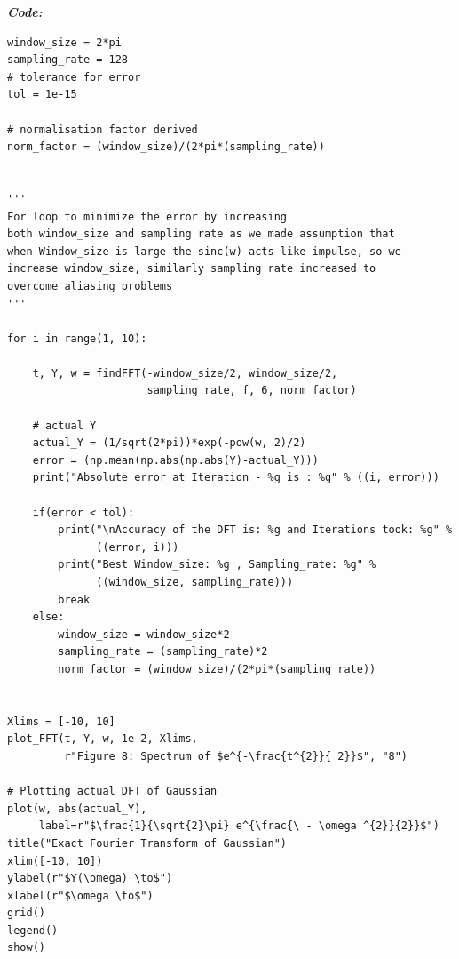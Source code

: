 \documentclass[11pt, a4paper]{article}
\begin{document}
\textit{\textbf{Code:}}
   \begin{lstlisting}
window_size = 2*pi
sampling_rate = 128
# tolerance for error
tol = 1e-15

# normalisation factor derived
norm_factor = (window_size)/(2*pi*(sampling_rate))


'''
For loop to minimize the error by increasing 
both window_size and sampling rate as we made assumption that
when Window_size is large the sinc(w) acts like impulse, so we
increase window_size, similarly sampling rate increased to 
overcome aliasing problems
'''

for i in range(1, 10):

    t, Y, w = findFFT(-window_size/2, window_size/2,
                      sampling_rate, f, 6, norm_factor)

    # actual Y
    actual_Y = (1/sqrt(2*pi))*exp(-pow(w, 2)/2)
    error = (np.mean(np.abs(np.abs(Y)-actual_Y)))
    print("Absolute error at Iteration - %g is : %g" % ((i, error)))

    if(error < tol):
        print("\nAccuracy of the DFT is: %g and Iterations took: %g" %
              ((error, i)))
        print("Best Window_size: %g , Sampling_rate: %g" %
              ((window_size, sampling_rate)))
        break
    else:
        window_size = window_size*2
        sampling_rate = (sampling_rate)*2
        norm_factor = (window_size)/(2*pi*(sampling_rate))


Xlims = [-10, 10]
plot_FFT(t, Y, w, 1e-2, Xlims,
         r"Figure 8: Spectrum of $e^{-\frac{t^{2}}{ 2}}$", "8")

# Plotting actual DFT of Gaussian
plot(w, abs(actual_Y),
     label=r"$\frac{1}{\sqrt{2}\pi} e^{\frac{\ - \omega ^{2}}{2}}$")
title("Exact Fourier Transform of Gaussian")
xlim([-10, 10])
ylabel(r"$Y(\omega) \to$")
xlabel(r"$\omega \to$")
grid()
legend()
show()

   \end{lstlisting}
   \newpage
\end{document}
